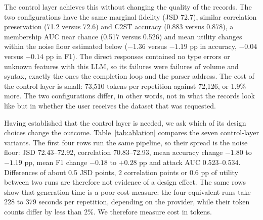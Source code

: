 \documentclass[conference]{IEEEtran}
\begin{document}
The control layer achieves this without changing the quality of the records. The two configurations have the same marginal fidelity (JSD 72.7), similar correlation preservation (71.2 versus 72.6) and C2ST accuracy (0.883 versus 0.878), a membership AUC near chance (0.517 versus 0.526) and mean utility changes within the noise floor estimated below ($-1.36$ versus $-1.19$ pp in accuracy, $-0.04$ versus $-0.14$ pp in F1). The direct responses contained no type errors or unknown features with this LLM, so its failures were failures of volume and syntax, exactly the ones the completion loop and the parser address. The cost of the control layer is small: 73,510 tokens per repetition against 72,126, or 1.9\% more. The two configurations differ, in other words, not in what the records look like but in whether the user receives the dataset that was requested.

Having established that the control layer is needed, we ask which of its design choices change the outcome. Table~\ref{tab:ablation} compares the seven control-layer variants. The first four rows run the same pipeline, so their spread is the noise floor: JSD 72.43--72.92, correlation 70.83--72.93, mean accuracy change $-1.80$ to $-1.19$ pp, mean F1 change $-0.18$ to $+0.28$ pp and attack AUC 0.523--0.534. Differences of about 0.5 JSD points, 2 correlation points or 0.6 pp of utility between two runs are therefore not evidence of a design effect. The same rows show that generation time is a poor cost measure: the four equivalent runs take 228 to 379 seconds per repetition, depending on the provider, while their token counts differ by less than 2\%. We therefore measure cost in tokens.
\end{document}

